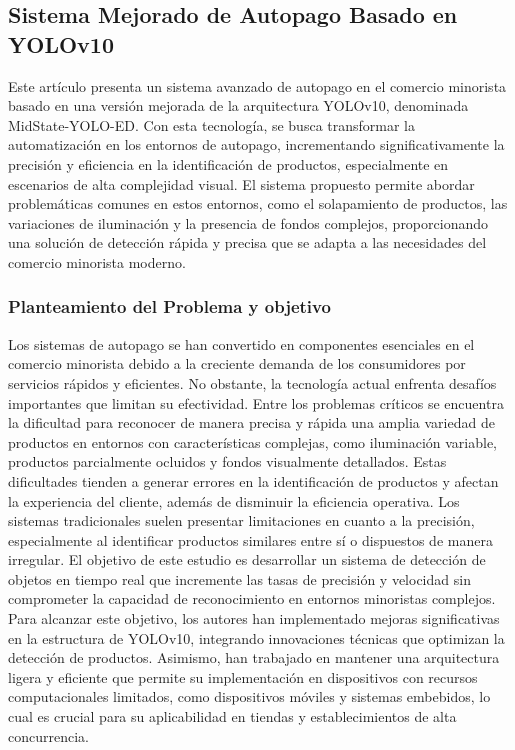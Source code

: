 \subsection{Sistema Mejorado de Autopago Basado en YOLOv10}

Este artículo presenta un sistema avanzado de autopago en el comercio minorista basado en una versión mejorada de la arquitectura YOLOv10, denominada MidState-YOLO-ED. Con esta tecnología, se busca transformar la automatización en los entornos de autopago, incrementando significativamente la precisión y eficiencia en la identificación de productos, especialmente en escenarios de alta complejidad visual. El sistema propuesto permite abordar problemáticas comunes en estos entornos, como el solapamiento de productos, las variaciones de iluminación y la presencia de fondos complejos, proporcionando una solución de detección rápida y precisa que se adapta a las necesidades del comercio minorista moderno.


\subsubsection{Planteamiento del Problema y objetivo }
Los sistemas de autopago se han convertido en componentes esenciales en el comercio minorista debido a la creciente demanda de los consumidores por servicios rápidos y eficientes. No obstante, la tecnología actual enfrenta desafíos importantes que limitan su efectividad. Entre los problemas críticos se encuentra la dificultad para reconocer de manera precisa y rápida una amplia variedad de productos en entornos con características complejas, como iluminación variable, productos parcialmente ocluidos y fondos visualmente detallados. Estas dificultades tienden a generar errores en la identificación de productos y afectan la experiencia del cliente, además de disminuir la eficiencia operativa. Los sistemas tradicionales suelen presentar limitaciones en cuanto a la precisión, especialmente al identificar productos similares entre sí o dispuestos de manera irregular. El objetivo de este estudio es desarrollar un sistema de detección de objetos en tiempo real que incremente las tasas de precisión y velocidad sin comprometer la capacidad de reconocimiento en entornos minoristas complejos. Para alcanzar este objetivo, los autores han implementado mejoras significativas en la estructura de YOLOv10, integrando innovaciones técnicas que optimizan la detección de productos. Asimismo, han trabajado en mantener una arquitectura ligera y eficiente que permite su implementación en dispositivos con recursos computacionales limitados, como dispositivos móviles y sistemas embebidos, lo cual es crucial para su aplicabilidad en tiendas y establecimientos de alta concurrencia.


